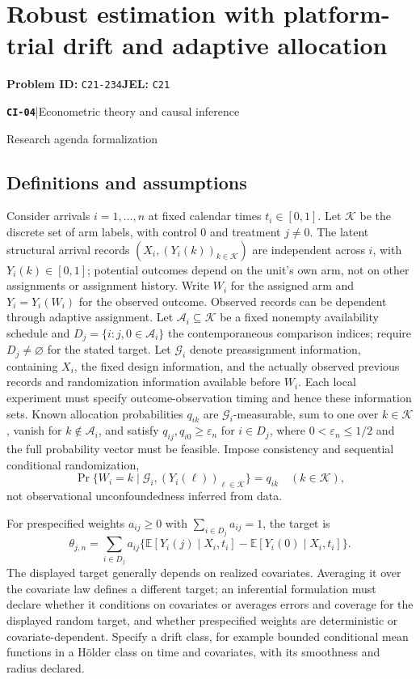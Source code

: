 \documentclass[11pt,a4paper]{article}
\newcommand{\E}{\mathbb E}
\newcommand{\entrymeta}[3]{{\sffamily\small\color{muted}\textbf{\texttt{#1}}\quad|\quad #2\par #3\par}}
\begin{document}
\section*{Robust estimation with platform-trial drift and adaptive allocation}
\textbf{Problem ID:} \texttt{C21-234}\quad \textbf{JEL:} \texttt{C21}\par
\label{problem:OP-0483}
\label{beyond:CI-04}
\entrymeta{CI-04}{Econometric theory and causal inference}{Research agenda formalization}
\subsection*{Definitions and assumptions}
Consider arrivals $i=1,\ldots,n$ at fixed calendar times $t_i\in[0,1]$. Let $\mathcal K$ be the discrete set of arm labels, with control $0$ and treatment $j\ne0$. The latent structural arrival records $(X_i,(Y_i(k))_{k\in\mathcal K})$ are independent across $i$, with $Y_i(k)\in[0,1]$; potential outcomes depend on the unit's own arm, not on other assignments or assignment history. Write $W_i$ for the assigned arm and $Y_i=Y_i(W_i)$ for the observed outcome. Observed records can be dependent through adaptive assignment. Let $\mathcal A_i\subseteq\mathcal K$ be a fixed nonempty availability schedule and $D_j=\{i:j,0\in\mathcal A_i\}$ the contemporaneous comparison indices; require $D_j\ne\varnothing$ for the stated target. Let $\mathcal G_i$ denote preassignment information, containing $X_i$, the fixed design information, and the actually observed previous records and randomization information available before $W_i$. Each local experiment must specify outcome-observation timing and hence these information sets. Known allocation probabilities $q_{ik}$ are $\mathcal G_i$-measurable, sum to one over $k\in\mathcal K$, vanish for $k\notin\mathcal A_i$, and satisfy $q_{ij},q_{i0}\geq\varepsilon_n$ for $i\in D_j$, where $0<\varepsilon_n\leq1/2$ and the full probability vector must be feasible. Impose consistency and sequential conditional randomization,
\[
 \Pr\{W_i=k\mid\mathcal G_i,(Y_i(\ell))_{\ell\in\mathcal K}\}=q_{ik}
 \quad(k\in\mathcal K),
\]
not observational unconfoundedness inferred from data.

For prespecified weights $a_{ij}\geq0$ with $\sum_{i\in D_j}a_{ij}=1$, the target is
\[
\theta_{j,n}=\sum_{i\in D_j}a_{ij}
 \{\E[Y_i(j)\mid X_i,t_i]-\E[Y_i(0)\mid X_i,t_i]\}.
\]
The displayed target generally depends on realized covariates. Averaging it over the covariate law defines a different target; an inferential formulation must declare whether it conditions on covariates or averages errors and coverage for the displayed random target, and whether prespecified weights are deterministic or covariate-dependent. Specify a drift class, for example bounded conditional mean functions in a Hölder class on time and covariates, with its smoothness and radius declared.
\end{document}
